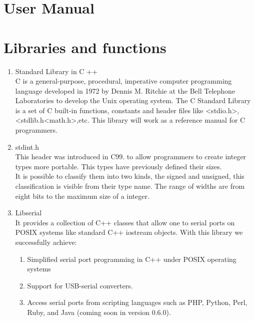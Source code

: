 \documentclass[twocolumn]{IEEEtran}
\begin{document}
\section{User Manual}



\section{Libraries and functions}

	\begin{enumerate}
    
    	\item Standard Library in C ++ \\
        C is a general-purpose, procedural, imperative computer programming 
        language developed in 1972 by Dennis M. Ritchie at the Bell Telephone 
        Laboratories to develop the Unix operating system. The C Standard 
        Library is a set of C built-in functions, constants and header files  
        like <stdio.h>, <stdlib.h<math.h>,etc. This library will work as a
        reference manual for C programmers.\\
    
        \item stdint.h\\
        This header was introduced in C99. to allow programmers to create integer 
        types more portable. This types have previously defined their sizes.\\ It is 
        possible to classify them into two kinds, the signed and unsigned, this 
        classification is visible from their type name. The range of widths are from 
        eight bits to the maximum size of a integer.\\
    
        \item Libserial\\
        It provides a collection of C++ classes that allow one to serial ports on 
        POSIX systems like standard C++ iostream objects. With this library we 
        successfully achieve:
        \begin{enumerate}
        \item Simplified serial port programming in C++ under POSIX operating systems\
        \item Support for USB-serial converters.\
        \item Access serial ports from scripting languages such as 									
        PHP, Python, Perl, Ruby, and Java (coming soon in version 0.6.0).\
		\end{enumerate}
            

\end{enumerate}
\end{document}
